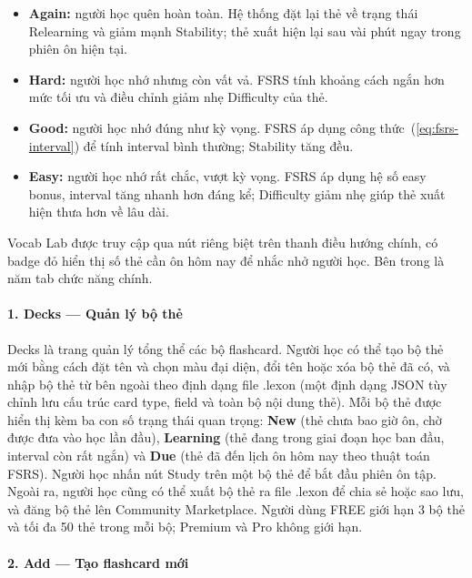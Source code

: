 \begin{itemize}
    \item \textbf{Again:} người học quên hoàn toàn. Hệ thống đặt lại thẻ về trạng thái Relearning và giảm mạnh Stability; thẻ xuất hiện lại sau vài phút ngay trong phiên ôn hiện tại.
    \item \textbf{Hard:} người học nhớ nhưng còn vất vả. FSRS tính khoảng cách ngắn hơn mức tối ưu và điều chỉnh giảm nhẹ Difficulty của thẻ.
    \item \textbf{Good:} người học nhớ đúng như kỳ vọng. FSRS áp dụng công thức~(\ref{eq:fsrs-interval}) để tính interval bình thường; Stability tăng đều.
    \item \textbf{Easy:} người học nhớ rất chắc, vượt kỳ vọng. FSRS áp dụng hệ số easy bonus, interval tăng nhanh hơn đáng kể; Difficulty giảm nhẹ giúp thẻ xuất hiện thưa hơn về lâu dài.
\end{itemize}

Vocab Lab được truy cập qua nút riêng biệt trên thanh điều hướng chính, có badge đỏ hiển thị số thẻ cần ôn hôm nay để nhắc nhở người học. Bên trong là năm tab chức năng chính.

\paragraph{1. Decks --- Quản lý bộ thẻ}

Decks là trang quản lý tổng thể các bộ flashcard. Người học có thể tạo bộ thẻ mới bằng cách đặt tên và chọn màu đại diện, đổi tên hoặc xóa bộ thẻ đã có, và nhập bộ thẻ từ bên ngoài theo định dạng file .lexon (một định dạng JSON tùy chỉnh lưu cấu trúc card type, field và toàn bộ nội dung thẻ). Mỗi bộ thẻ được hiển thị kèm ba con số trạng thái quan trọng: \textbf{New} (thẻ chưa bao giờ ôn, chờ được đưa vào học lần đầu), \textbf{Learning} (thẻ đang trong giai đoạn học ban đầu, interval còn rất ngắn) và \textbf{Due} (thẻ đã đến lịch ôn hôm nay theo thuật toán FSRS). Người học nhấn nút Study trên một bộ thẻ để bắt đầu phiên ôn tập. Ngoài ra, người học cũng có thể xuất bộ thẻ ra file .lexon để chia sẻ hoặc sao lưu, và đăng bộ thẻ lên Community Marketplace. Người dùng FREE giới hạn 3 bộ thẻ và tối đa 50 thẻ trong mỗi bộ; Premium và Pro không giới hạn.

\paragraph{2. Add --- Tạo flashcard mới}

